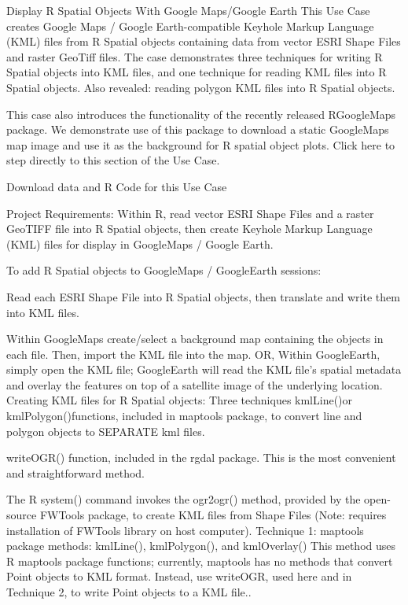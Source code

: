 Display R Spatial Objects With Google Maps/Google Earth
This Use Case creates Google Maps / Google Earth-compatible Keyhole Markup Language (KML) files from R Spatial objects containing data from vector ESRI Shape Files and raster GeoTiff files. The case demonstrates three techniques for writing R Spatial objects into KML files, and one technique for reading KML files into R Spatial objects. Also revealed: reading polygon KML files into R Spatial objects.

This case also introduces the functionality of the recently released RGoogleMaps package. We demonstrate use of this package to download a static GoogleMaps map image and use it as the background for R spatial object plots. Click here to step directly to this section of the Use Case.

Download data and R Code for this Use Case

Project Requirements:
Within R, read vector ESRI Shape Files and a raster GeoTIFF file into R Spatial objects, then create Keyhole Markup Language (KML) files for display in GoogleMaps / Google Earth.

To add R Spatial objects to GoogleMaps / GoogleEarth sessions:

Read each ESRI Shape File into R Spatial objects, then translate and write them into KML files.

Within GoogleMaps create/select a background map containing the objects in each file. Then, import the KML file into the map. OR,
Within GoogleEarth, simply open the KML file; GoogleEarth will read the KML file's spatial metadata and overlay the features on top of a satellite image of the underlying location.
Creating KML files for R Spatial objects: Three techniques
kmlLine()or kmlPolygon()functions, included in maptools package, to convert line and polygon objects to SEPARATE kml files.

writeOGR() function, included in the rgdal package. This is the most convenient and straightforward method.

The R system() command invokes the ogr2ogr() method,  provided by the open-source FWTools  package, to create KML files from Shape Files (Note: requires installation of FWTools library on host computer).
Technique 1: maptools package methods: kmlLine(), kmlPolygon(), and kmlOverlay()
This method uses R maptools package functions; currently, maptools has no methods that convert Point objects to KML format. Instead, use writeOGR, used here and in Technique 2, to write Point objects to a KML file..

